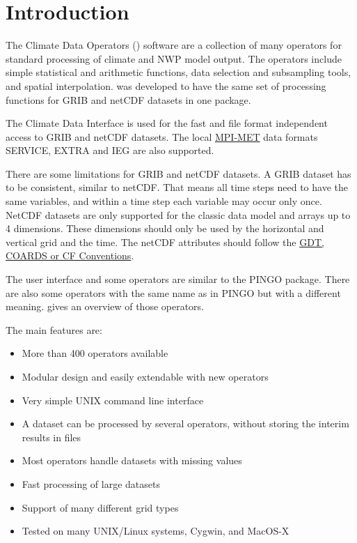 \chapter{Introduction}

The Climate Data Operators ({\CDO}) software are a collection of many operators
for standard processing of climate and NWP model output.
The operators include simple statistical and arithmetic functions, data selection
and subsampling tools, and spatial interpolation.
{\CDO} was developed to have the same set of processing functions for GRIB \cite{GRIB} and netCDF \cite{netCDF}
datasets in one package.

The Climate Data Interface \cite{CDI} is used for the fast and file format
independent access to GRIB and netCDF datasets.
The local \href{http://www.mpimet.mpg.de/}{MPI-MET} data formats SERVICE, EXTRA and 
IEG are also supported.

There are some limitations for GRIB and netCDF datasets.
A GRIB dataset has to be consistent, similar to netCDF.
That means all time steps need to have the same variables, and
within a time step each variable may occur only once.
NetCDF datasets are only supported for the classic data model and arrays up to 4 dimensions.
These dimensions should only be used by the horizontal and vertical grid and the time.
The netCDF attributes should follow the
\href{http://ftp.unidata.ucar.edu/software/netcdf/docs/conventions.html}
     {GDT, COARDS or CF Conventions}.

The user interface and some operators are similar to the PINGO \cite{PINGO} package.
There are also some operators with the same name as in PINGO but with a 
different meaning.  gives an overview of 
those operators.

The main {\CDO} features are:
\begin{itemize}
\item More than 400 operators available
\item Modular design and easily extendable with new operators
\item Very simple UNIX command line interface
\item A dataset can be processed by several operators,
      without storing the interim results in files %
\item Most operators handle datasets with missing values
\item Fast processing of large datasets
\item Support of many different grid types
\item Tested on many UNIX/Linux systems, Cygwin, and MacOS-X
\end{itemize}














